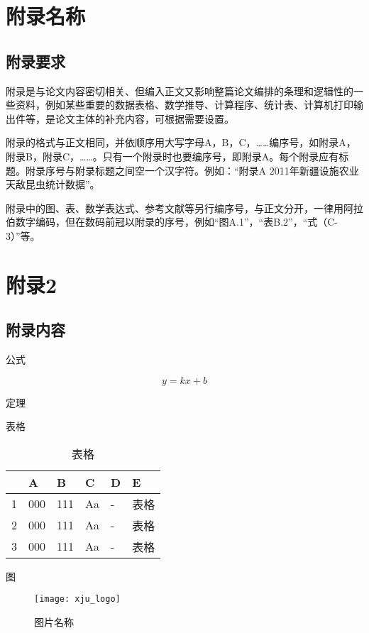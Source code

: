 \chapter{附录名称}

\section{附录要求}

附录是与论文内容密切相关、但编入正文又影响整篇论文编排的条理和逻辑性的一些资料，例如某些重要的数据表格、数学推导、计算程序、统计表、计算机打印输出件等，是论文主体的补充内容，可根据需要设置。

附录的格式与正文相同，并依顺序用大写字母A，B，C，……编序号，如附录A，附录B，附录C，……。只有一个附录时也要编序号，即附录A。每个附录应有标题。附录序号与附录标题之间空一个汉字符。例如：“附录A  2011年新疆设施农业天敌昆虫统计数据”。

附录中的图、表、数学表达式、参考文献等另行编序号，与正文分开，一律用阿拉伯数字编码，但在数码前冠以附录的序号，例如“图A.1”，“表B.2”，“式（C-3）”等。


\chapter{附录2}

\section{附录内容}

公式

\begin{equation}
	y=kx+b
\end{equation}

\begin{theorem}
	定理
\end{theorem}

表格

\begin{table}[htb]
	\centering
	\caption{表格}
	\begin{tabular}{llllll}
		\toprule[1.5pt]
		& A & B & C & D & E \\
		\midrule[1pt]
		1 & 000 & 111 & Aa & - & 表格	\\
		2 & 000 & 111 & Aa & - & 表格	\\
		3 & 000 & 111 & Aa & - & 表格	\\
		\bottomrule[1.5pt]
	\end{tabular}
\end{table}

图

\begin{figure}[hbt]
	\centering
	\texttt{[image: xju\_logo]}
	\caption{图片名称}
\end{figure}